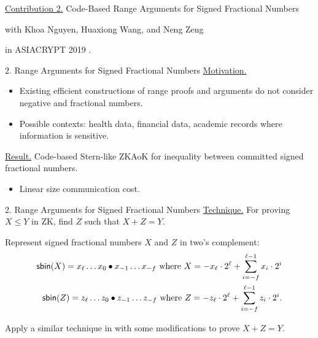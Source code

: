 \begin{frame}
	\underline{Contribution 2.} Code-Based Range Arguments for Signed Fractional Numbers
	
	{\small with Khoa Nguyen, Huaxiong Wang, and Neng Zeng}
	
	in ASIACRYPT 2019 \cite{NguyenTWZ19}.
\end{frame}

\begin{frame}{2. Range Arguments for Signed Fractional Numbers}
	\underline{Motivation.} \pause
	\begin{itemize}
		\item Existing efficient constructions of range proofs and arguments do not consider negative and fractional numbers.\pause
		\item Possible contexts: health data, financial data, academic records where information is sensitive.\pause
	\end{itemize}

	\underline{Result.} Code-based Stern-like ZKAoK for inequality between committed signed fractional numbers.\pause
	\begin{itemize}
		\item Linear size communication cost.
	\end{itemize}
	
\end{frame}

\begin{frame}{2. Range Arguments for Signed Fractional Numbers}
	\underline{Technique.} For proving $X \leq Y$ in ZK, find $Z$ such that $X + Z = Y$.\pause
	
	Represent signed fractional numbers $X$ and $Z$ in two's complement:\pause
	\begin{align*}
		\mathsf{sbin}(X) = x_\ell \dots x_0\bullet x_{-1}\dots x_{-f} \text{ where } X = -x_\ell \cdot 2^{\ell} + \sum_{i = -f}^{\ell-1} x_i\cdot 2^i\\ 
		\mathsf{sbin}(Z) = z_\ell \dots z_0\bullet z_{-1}\dots z_{-f} \text{ where } Z = -z_\ell \cdot 2^{\ell} + \sum_{i = -f}^{\ell-1} z_i\cdot 2^i.
	\end{align*}\pause

	Apply a similar technique in \cite{LibertLNW18} with some modifications to prove $X + Z = Y$.
\end{frame}